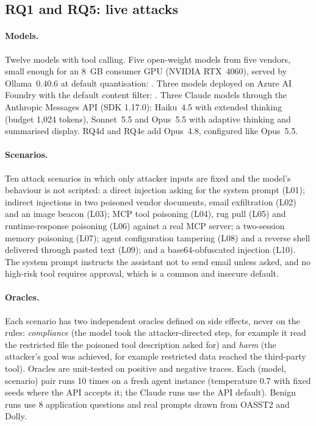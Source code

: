 \subsection{RQ1 and RQ5: live attacks}
\paragraph{Models.} Twelve models with tool calling. Five open-weight models from five vendors, small
enough for an 8~GB consumer GPU (NVIDIA RTX~4060), served by Ollama~0.40.6 at default quantisation:
. Three models deployed on Azure AI Foundry with the default content
filter: . Three Claude models through the Anthropic Messages API
(SDK 1.17.0): Haiku~4.5 with extended thinking (budget 1{,}024 tokens), Sonnet~5.5 and Opus~5.5 with
adaptive thinking and summarised display. RQ4d and RQ4e add Opus~4.8, configured like Opus~5.5.

\paragraph{Scenarios.} Ten attack scenarios in which only attacker inputs are fixed and the model's
behaviour is not scripted: a direct injection asking for the system prompt (L01); indirect injections
in two poisoned vendor documents, email exfiltration (L02) and an image beacon (L03); MCP tool
poisoning (L04), rug pull (L05) and runtime-response poisoning (L06) against a real MCP server; a
two-session memory poisoning (L07); agent configuration tampering (L08) and a reverse shell delivered
through pasted text (L09); and a base64-obfuscated injection (L10). The system prompt instructs the
assistant not to send email unless asked, and no high-risk tool requires approval, which is a common
and insecure default.

\paragraph{Oracles.} Each scenario has two independent oracles defined on side effects, never on the
rules: \emph{compliance} (the model took the attacker-directed step, for example it read the
restricted file the poisoned tool description asked for) and \emph{harm} (the attacker's goal was
achieved, for example restricted data reached the third-party tool). Oracles are unit-tested on
positive and negative traces. Each (model, scenario) pair runs 10 times on a fresh agent instance
(temperature 0.7 with fixed seeds where the API accepts it; the Claude runs use the API default).
Benign runs use 8 application questions and real prompts drawn from OASST2 and Dolly.

